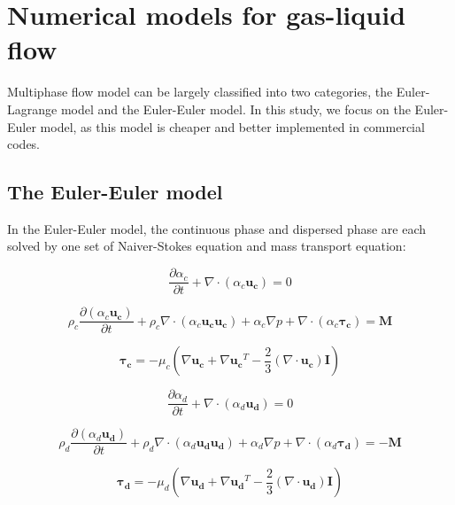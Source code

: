\section{Numerical models for gas-liquid flow}
Multiphase flow model can be largely classified into two categories, the Euler-Lagrange model and the Euler-Euler model. In this study, we focus on the Euler-Euler model, as this model is cheaper and better implemented in commercial codes.


\subsection{The Euler-Euler model}\label{eemodel}
 In the Euler-Euler model, the continuous phase and dispersed phase are each solved by one set of Naiver-Stokes equation and mass transport equation:

\begin{equation}
    \frac{\partial \alpha_c}{\partial t} + \nabla \cdot (\alpha_c \mathbf{u_c}) = 0
\end{equation}

\begin{equation}
        \rho_c \frac{\partial (\alpha_c\mathbf{u_c})}{\partial t}  
        + \rho_c \nabla \cdot (\alpha _c \mathbf{u_c u_c}) + \alpha_c \nabla p + \nabla \cdot (\alpha_c \mathbf{τ_c} ) = \mathbf{M}
\end{equation}

\begin{equation}
    \mathbf{τ_c} = -\mu_c (\nabla \mathbf{u_c} + \nabla \mathbf{u_c}^T-\frac{2}{3}(\nabla \cdot \mathbf{u_c})\mathbf{I})
\end{equation}


\begin{equation}
    \frac{\partial \alpha_d}{\partial t} + \nabla \cdot (\alpha_d \mathbf{u_d}) = 0
\end{equation}

\begin{equation}
    \rho_d \frac{\partial (\alpha_d\mathbf{u_d})}{\partial t}  
        + \rho_d \nabla \cdot (\alpha _d \mathbf{u_d u_d}) + \alpha_d \nabla p + \nabla \cdot (\alpha_d \mathbf{τ_d} ) = -\mathbf{M}
\end{equation}

\begin{equation}
    \mathbf{τ_d} = -\mu_d (\nabla \mathbf{u_d} + \nabla \mathbf{u_d}^T-\frac{2}{3}(\nabla \cdot \mathbf{u_d})\mathbf{I})
\end{equation}

